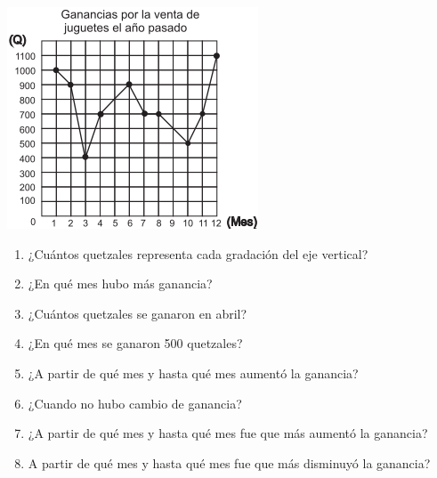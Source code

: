 \documentclass[10pt,twoside]{article}
\begin{document}
\begin{enumerate}
\begin{minipage}{.5\textwidth}
\includegraphics[scale=.75]{Images/grafica05.png} 
\end{minipage}
\begin{minipage}{.5\textwidth}
\begin{enumerate}
\item ¿Cuántos quetzales representa cada gradación del eje vertical?
\item ¿En qué mes hubo más ganancia?
\item ¿Cuántos quetzales se ganaron en abril?
\item ¿En qué mes se ganaron 500 quetzales?
\item ¿A partir de qué mes y hasta qué mes aumentó la ganancia?
\item ¿Cuando no hubo cambio de ganancia?
\item ¿A partir de qué mes y hasta qué mes fue que más aumentó la ganancia?
\item A partir de qué mes y hasta qué mes fue que más disminuyó la ganancia?
\end{enumerate}
\end{minipage}
\end{enumerate}
\end{document}
